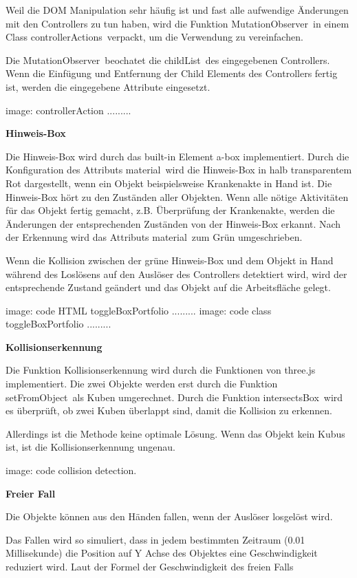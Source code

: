   Weil die DOM Manipulation sehr häufig ist und fast alle aufwendige Änderungen mit den Controllers zu tun haben, wird die Funktion \glqq MutationObserver\grqq\ in einem Class \glqq controllerActions\grqq\ verpackt, um die Verwendung zu vereinfachen.
  
  Die \glqq MutationObserver\grqq\ beochatet die \glqq childList\grqq\ des eingegebenen Controllers. Wenn die Einfügung und Entfernung der Child Elements des Controllers fertig ist, werden die eingegebene Attribute eingesetzt. 
  
  image: controllerAction .........
  
  \textbf{Hinweis-Box}
  
  Die Hinweis-Box wird durch das built-in Element a-box implementiert. Durch die Konfiguration des Attributs \glqq material\grqq\ wird die Hinweis-Box in halb transparentem Rot dargestellt, wenn ein Objekt beispielsweise Krankenakte in Hand ist. Die Hinweis-Box hört zu den Zuständen aller Objekten. Wenn alle nötige Aktivitäten für das Objekt fertig gemacht, z.B. Überprüfung der Krankenakte, werden die Änderungen der entsprechenden Zuständen von der Hinweis-Box erkannt. Nach der Erkennung wird das Attributs \glqq material\grqq\ zum Grün umgeschrieben.
  
  Wenn die Kollision zwischen der grüne Hinweis-Box und dem Objekt in Hand während des Loslösens auf den Auslöser des Controllers detektiert wird, wird der entsprechende Zustand geändert und das Objekt auf die Arbeitsfläche gelegt.
  
  image: code HTML toggleBoxPortfolio .........
  image: code class toggleBoxPortfolio .........
  
  \textbf{Kollisionserkennung}
  
  Die Funktion Kollisionserkennung wird durch die Funktionen von three.js implementiert. Die zwei Objekte werden erst durch die Funktion \glqq setFromObject\grqq\ als Kuben umgerechnet. Durch die Funktion \glqq intersectsBox\grqq\ wird es überprüft, ob zwei Kuben überlappt sind, damit die Kollision zu erkennen.
  
  Allerdings ist die Methode keine optimale Lösung. Wenn das Objekt kein Kubus ist, ist die Kollisionserkennung ungenau.
  
  image: code collision detection.
  
  \textbf{Freier Fall}
  
  Die Objekte können aus den Händen fallen, wenn der Auslöser losgelöst wird.
  
  Das Fallen wird so simuliert, dass in jedem bestimmten Zeitraum (0.01 Millisekunde) die Position auf Y Achse des Objektes eine Geschwindigkeit reduziert wird. Laut der Formel der Geschwindigkeit des freien Falls 
  
